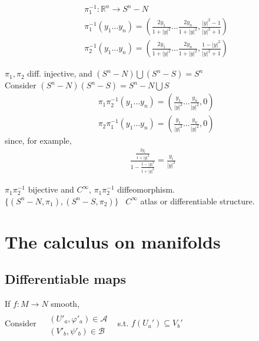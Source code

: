 \documentclass{book}
\newcommand{\exercisehead}[1]
  {\smallskip
   \noindent{\large\bf Exercise #1.}
   }
\begin{document}
\[
\begin{aligned}
  & \pi_1^{-1}: \mathbb{R}^n \to S^n - N \\ 
  & \pi_1^{-1}(y_1 \dots y_n) = \left( \frac{2y_1}{ 1 + |y|^2 } \dots \frac{2y_n}{1+ |y|^2 } , \frac{ |y|^2 - 1 }{ |y|^2 + 1 } \right) \\ 
  & \pi_2^{-1}(y_1 \dots y_n) = \left( \frac{2y_1}{ 1 + |y|^2 } \dots \frac{2y_n}{1+ |y|^2 } , \frac{ 1 - |y|^2  }{ |y|^2 + 1 } \right)
\end{aligned}
\]

$\pi_1,\pi_2$ diff. injective, and $(S^n - N ) \bigcup (S^n-S) = S^n$ \\

Consider $(S^n - N)(S^n-S) = S^n - N \bigcup S$ 
\[
\begin{aligned}
  & \pi_1 \pi_2^{-1}(y_1 \dots y_n) = \left( \frac{y_1 }{ |y|^2} \dots \frac{y_n}{|y|^2} , 0 \right) \\ 
  & \pi_2 \pi_1^{-1}(y_1 \dots y_n) = \left( \frac{y_1 }{ |y|^2} \dots \frac{y_n}{|y|^2} , 0 \right) 
\end{aligned}
\]
since, for example, 
\[
\begin{gathered}
\frac{   \frac{2y_i }{ 1 + |y|^2} }{ 1 - \frac{ 1 - |y|^2}{ 1 + |y|^2 }} = \frac{y_i }{ |y|^2 }
\end{gathered}
\]



$\pi_1 \pi_2^{-1}$ bijective and $C^{\infty}$, $\pi_1 \pi_2^{-1}$ diffeomorphism.   \\

$\lbrace (S^n-N, \pi_1), (S^n - S, \pi_2) \rbrace$ \, $C^{\infty}$ atlas or differentiable structure.  


\section{The calculus on manifolds}



\subsection{Differentiable maps}

\exercisehead{5.2} If $f:M\to N$ smooth, \\
Consider $\begin{aligned} & \quad \\ 
& (U'_a, \varphi'_a) \in \mathcal{A} \\ 
& (V'_b, \psi'_b)\in\mathcal{B}\end{aligned}$ \, s.t. $f(U_a') \subseteq V_b'$ \\
\end{document}
